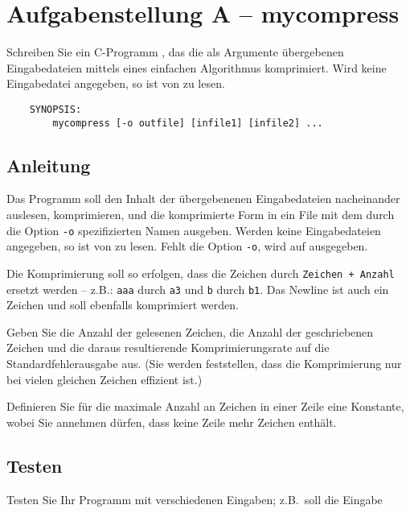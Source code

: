 




\section*{Aufgabenstellung A -- mycompress}
      Schreiben Sie ein C-Programm ,
      das die als Argumente übergebenen Eingabedateien mittels
      eines einfachen Algorithmus komprimiert.
      Wird keine Eingabedatei angegeben, so ist von
       zu lesen.
\begin{verbatim}
    SYNOPSIS:
        mycompress [-o outfile] [infile1] [infile2] ...
\end{verbatim}

\subsection*{Anleitung}
      Das Programm soll den Inhalt der übergebenenen Eingabedateien
      nacheinander auslesen, komprimieren, und die komprimierte Form in ein
      File mit dem durch die Option \verb|-o| spezifizierten Namen
       ausgeben.
      Werden keine Eingabedateien angegeben, so ist von  zu
      lesen.
      Fehlt die Option \verb|-o|, wird auf  ausgegeben.

      Die Komprimierung soll so erfolgen, dass die Zeichen durch
      \verb|Zeichen + Anzahl| ersetzt werden -- z.B.: \verb|aaa| durch
      \verb|a3| und \verb|b| durch \verb|b1|.
      Das Newline ist auch ein Zeichen und soll ebenfalls komprimiert werden.

      Geben Sie die Anzahl der gelesenen Zeichen, die Anzahl der geschriebenen
      Zeichen und die daraus resultierende Komprimierungsrate
      auf die Standardfehlerausgabe  aus.
      (Sie werden feststellen, dass die Komprimierung nur bei vielen gleichen
      Zeichen effizient ist.)

      Definieren Sie für die maximale Anzahl an Zeichen in einer
      Zeile eine Konstante, wobei Sie annehmen dürfen, dass keine
      Zeile mehr Zeichen enthält.

\subsection*{Testen}
      Testen Sie Ihr Programm mit verschiedenen Eingaben; z.B.\ soll
      die Eingabe

